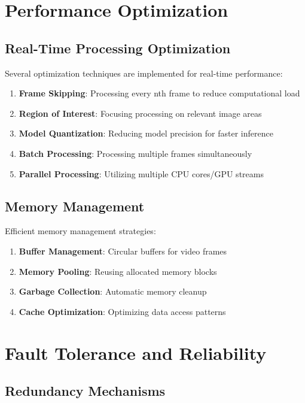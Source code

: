 \section{Performance Optimization}

\subsection{Real-Time Processing Optimization}

Several optimization techniques are implemented for real-time performance:

\begin{enumerate}
    \item \textbf{Frame Skipping}: Processing every nth frame to reduce computational load
    \item \textbf{Region of Interest}: Focusing processing on relevant image areas
    \item \textbf{Model Quantization}: Reducing model precision for faster inference
    \item \textbf{Batch Processing}: Processing multiple frames simultaneously
    \item \textbf{Parallel Processing}: Utilizing multiple CPU cores/GPU streams
\end{enumerate}

\subsection{Memory Management}

Efficient memory management strategies:

\begin{enumerate}
    \item \textbf{Buffer Management}: Circular buffers for video frames
    \item \textbf{Memory Pooling}: Reusing allocated memory blocks
    \item \textbf{Garbage Collection}: Automatic memory cleanup
    \item \textbf{Cache Optimization}: Optimizing data access patterns
\end{enumerate}

\section{Fault Tolerance and Reliability}

\subsection{Redundancy Mechanisms}

